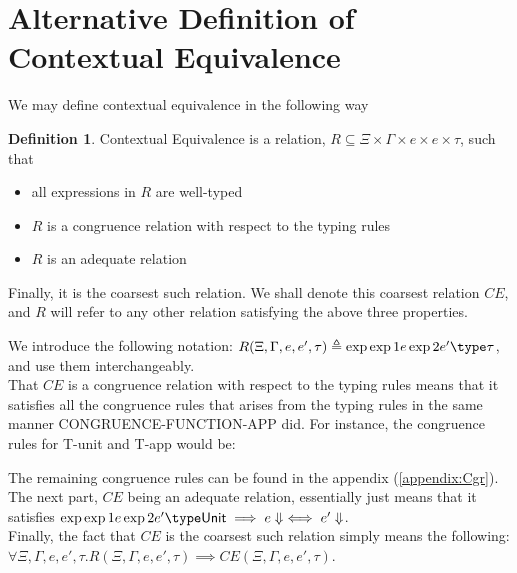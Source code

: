 \documentclass[twoside,11pt,openright]{report}
\theoremstyle{definition}
\newtheorem{definition}{Definition}[section]
\newcommand{\expr}{e}
\newcommand{\TT}{()}
\newcommand{\Tvar}{X}
\newcommand{\Tapp}[1]{#1\;\_}
\newcommand{\subst}[3]{#1{\left[#3 \middle/ #2 \right]}}
\newcommand{\Tunit}{\mathsf{Unit}}
\newcommand{\Tall}[2]{\forall #1.\; #2}
\newcommand{\typ}{\tau}
\newcommand{\venv}{\Gamma}
\newcommand{\tenv}{\Xi}
\newcommand{\empvenv}{\bullet}
\newcommand{\emptenv}{\bullet}
\def\envscteqgen#1#2\exp1#3\exp2#4\type#5
\begin{document}
\section{Alternative Definition of Contextual Equivalence}
We may define contextual equivalence in the following way
\begin{definition}\label{def:CE2}
  Contextual Equivalence is a relation, $R \subseteq \tenv \times \venv \times \expr \times \expr \times \typ$, such that
  \begin{itemize}
    \item all expressions in $R$ are well-typed
    \item $R$ is a congruence relation with respect to the typing rules
    \item $R$ is an adequate relation
  \end{itemize}
  Finally, it is the coarsest such relation. We shall denote this coarsest relation $CE$, and $R$ will refer to any other relation satisfying the above three properties. 
\end{definition}
We introduce the following notation: $R(\tenv, \venv, \expr, \expr', \typ) \triangleq \envscteqgen \tenv \venv \exp1 \expr \exp2 \expr' \type \typ$, and use them interchangeably.\\ 
That $CE$ is a congruence relation with respect to the typing rules means that it satisfies all the congruence rules that arises from the typing rules in the same manner CONGRUENCE-FUNCTION-APP did. For instance, the congruence rules for T-unit and T-app would be:
The remaining congruence rules can be found in the appendix (\ref{appendix:Cgr}).\\
The next part, $CE$ being an adequate relation, essentially just means that it satisfies $\envscteqgen \empvenv \emptenv \exp1 \expr \exp2 \expr' \type \Tunit \implies \expr \Downarrow \iff \expr' \Downarrow$.\\
Finally, the fact that $CE$ is the coarsest such relation simply means the following: $\forall \tenv, \venv, \expr, \expr', \typ . R(\tenv, \venv, \expr, \expr', \typ) \implies CE(\tenv, \venv, \expr, \expr', \typ)$.\\
\end{document}
